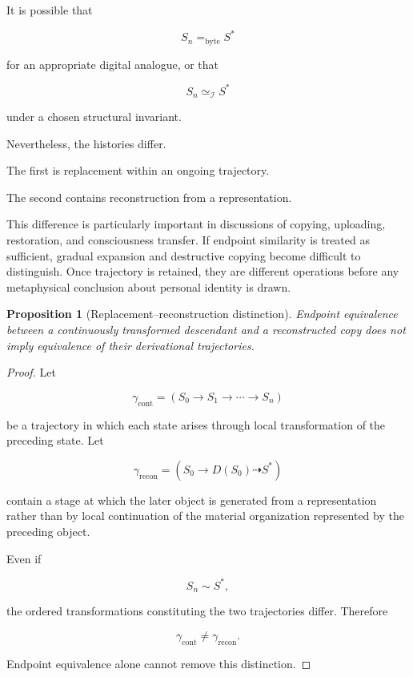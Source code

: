 \documentclass[
  11pt,
  a4paper,
  DIV=12,
  BCOR=0mm,
  parskip=half-
]{scrartcl}
\newcommand{\Inv}{\mathcal I}
\newcommand{\eqbyte}{=_{\mathrm{byte}}}
\newcommand{\simI}{\simeq_{\Inv}}
\theoremstyle{definition}
\theoremstyle{plain}
\newtheorem{proposition}[definition]{Proposition}
\theoremstyle{remark}
\begin{document}
It is possible that

\[
  S_n\eqbyte S^\ast
\]

for an appropriate digital analogue, or that

\[
  S_n\simI S^\ast
\]

under a chosen structural invariant.

Nevertheless, the histories differ.

The first is replacement within an ongoing trajectory.

The second contains reconstruction from a representation.

This difference is particularly important in discussions of copying,
uploading, restoration, and consciousness transfer. If endpoint similarity is
treated as sufficient, gradual expansion and destructive copying become
difficult to distinguish. Once trajectory is retained, they are different
operations before any metaphysical conclusion about personal identity is
drawn.

\begin{proposition}[Replacement--reconstruction distinction]
\label{prop:replacement-reconstruction}
Endpoint equivalence between a continuously transformed descendant and a
reconstructed copy does not imply equivalence of their derivational
trajectories.
\end{proposition}

\begin{proof}
Let

\[
  \gamma_{\mathrm{cont}}
  =
  \left(
  S_0\to S_1\to\cdots\to S_n
  \right)
\]

be a trajectory in which each state arises through local transformation of
the preceding state. Let

\[
  \gamma_{\mathrm{recon}}
  =
  \left(
  S_0\to D(S_0)\dashrightarrow S^\ast
  \right)
\]

contain a stage at which the later object is generated from a representation
rather than by local continuation of the material organization represented by
the preceding object.

Even if

\[
  S_n\sim S^\ast,
\]

the ordered transformations constituting the two trajectories differ.
Therefore

\[
  \gamma_{\mathrm{cont}}
  \neq
  \gamma_{\mathrm{recon}}.
\]

Endpoint equivalence alone cannot remove this distinction.
\end{proof}
\end{document}
